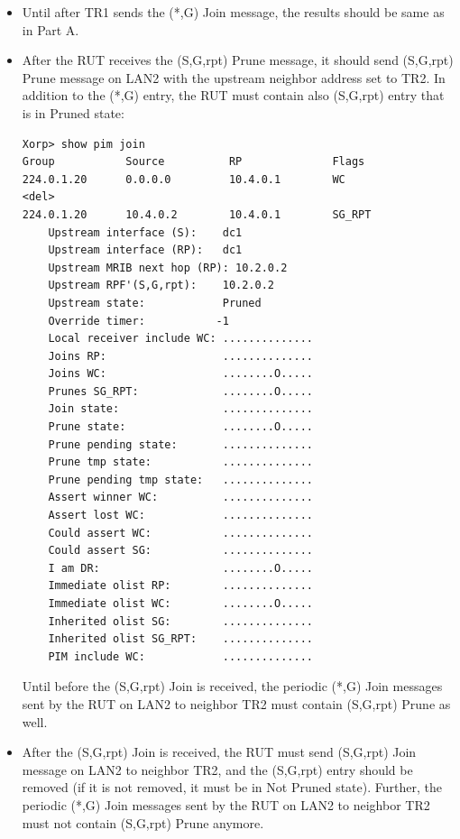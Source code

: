 \documentclass[11pt]{report}
\begin{document}
\begin{itemize}

  \item Until after TR1 sends the (*,G) Join message, the results should be
  same as in Part A.

  \item After the RUT receives the (S,G,rpt) Prune message, it should send
  (S,G,rpt) Prune message on LAN2 with the upstream neighbor address set to
  TR2. In addition to the (*,G) entry, the RUT must contain also
  (S,G,rpt) entry that is in Pruned state:

\begin{verbatim}
Xorp> show pim join 
Group           Source          RP              Flags
224.0.1.20      0.0.0.0         10.4.0.1        WC   
<del>
224.0.1.20      10.4.0.2        10.4.0.1        SG_RPT 
    Upstream interface (S):    dc1
    Upstream interface (RP):   dc1
    Upstream MRIB next hop (RP): 10.2.0.2
    Upstream RPF'(S,G,rpt):    10.2.0.2
    Upstream state:            Pruned 
    Override timer:           -1
    Local receiver include WC: ..............
    Joins RP:                  ..............
    Joins WC:                  ........O.....
    Prunes SG_RPT:             ........O.....
    Join state:                ..............
    Prune state:               ........O.....
    Prune pending state:       ..............
    Prune tmp state:           ..............
    Prune pending tmp state:   ..............
    Assert winner WC:          ..............
    Assert lost WC:            ..............
    Could assert WC:           ..............
    Could assert SG:           ..............
    I am DR:                   ........O.....
    Immediate olist RP:        ..............
    Immediate olist WC:        ........O.....
    Inherited olist SG:        ..............
    Inherited olist SG_RPT:    ..............
    PIM include WC:            ..............
\end{verbatim}

  Until before the (S,G,rpt) Join is received, the periodic (*,G) Join messages
  sent by the RUT on LAN2 to neighbor TR2 must contain (S,G,rpt) Prune as
  well.

  \item After the (S,G,rpt) Join is received, the RUT must send (S,G,rpt) Join
  message on LAN2 to neighbor TR2, and the (S,G,rpt) entry should be removed
  (if it is not removed, it must be in Not Pruned state).
  Further, the periodic (*,G) Join messages sent by the RUT on LAN2 to
  neighbor TR2 must not contain (S,G,rpt) Prune anymore.

\end{itemize}
\end{document}
